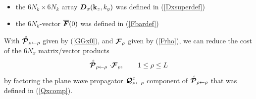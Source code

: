 \begin{itemize}
\begin{equation}
{\begin{array}{ccccc}{\begin{array}{cc}{\bf 0}&{\bf 0}\\
{\bf 0}&{\bf 0}\end{array}}
 \vdots&&&{\begin{array}{cc}{\bf 0}&{\bf 0}\\
{\bf 0}&{\bf 0}\end{array}}&{\begin{array}{cc}{\bf 0}&{\bf 0}\\
 {\bf E}_{x}& {\bf 0}\end{array}}\\
{\begin{array}{cc}{\bf 0}&{\bf E}_{x}^{ N-1}\\
{\bf 0}&{\bf 0}\end{array}}&{\begin{array}{cc}{\bf 0}&{\bf E}_{x}^{ N-2}\\
{\bf 0}&{\bf 0}\end{array}}& \cdots &{\begin{array}{cc} {\bf 0}&{\bf E}_{x}\\
{\bf 0}&{\bf 0}\end{array}}&{\begin{array}{cc} {\bf 0}&{\bf 0}\\
{\bf 0}&{\bf 0}\end{array}}\end{array}}
\right]
\end{equation}


\item the $6 N_k \times 6 N_k$ array ${\mbox{\boldmath$\mit D$\unboldmath}}_{x}({\bf k}_{z},{k}_{y})$ was defined in (\ref{Dxsuperdef})

\item the $6 N_k$-vector $\overline{\mbox{\boldmath$\mit F$\unboldmath}}(0)$ was defined in (\ref{Fbardef})
\end{itemize}

With $\stackrel{\scriptscriptstyle _{\,\,\circ}}{ \mbox{\boldmath$\cal P$\unboldmath}}_{\rho \leftarrow   \rho}$ given by (\ref{GGx0}), and  ${\mbox{\boldmath$\cal F$\unboldmath}}_{\rho}$ given by
(\ref{Frho}), we can reduce the cost of the $6 N_x$ matrix/vector 
products
\[
\stackrel{\scriptscriptstyle _{\,\,\circ}}{ \mbox{\boldmath$\cal P$\unboldmath}}_{\rho \leftarrow   \rho}\cdot{\mbox{\boldmath$\cal F$\unboldmath}}_{\rho}, \qquad 1 \le \rho \le L
\]
by factoring the plane wave propagator ${\mbox{\boldmath$\cal Q$\unboldmath}}^{x}_{\rho \leftarrow   \rho}$
component of $\stackrel{\scriptscriptstyle _{\,\,\circ}}{ \mbox{\boldmath$\cal P$\unboldmath}}_{\rho \leftarrow   \rho}$ that was defined in 
(\ref{Qxcomp}).

